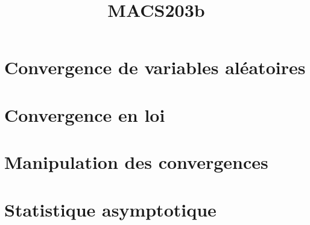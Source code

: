 \documentclass[a4paper,9pt]{article}
\title{\vspace{-1.2cm} \textbf{MACS203b}}
\begin{document}
\maketitle

\vspace{-1.5cm}


\section{Convergence de variables aléatoires}
	

\section{Convergence en loi}
	

\section{Manipulation des convergences}
	

\section{Statistique asymptotique}
	

%	
\end{document}
